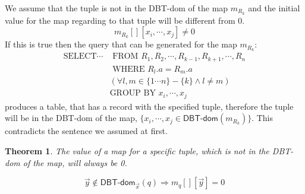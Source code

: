 \documentclass[12pt]{article}
\newtheorem{theorem}{Theorem}
\newcommand{\dom}{\textsf{DBT-dom}}
\begin{document}
We assume that the tuple is not in the \dom{} of the map $m_{R_k}$ and the initial value for the map regarding to that tuple will be different from 0.
$$m_{R_k}[][x_i,\cdots,x_j]\not= 0$$
If this is true then the query that can be generated for the map $m_{R_k}$:
\begin{align*}
\mbox{SELECT}\cdots&\mbox{ FROM }R_1,R_2,\cdots,R_{k-1},R_{k+1},\cdots,R_n\\
&\mbox{ WHERE }R_l.a=R_m.a\\
&(\forall l,m\in\{1\cdots n\}-\{k\}\land l\not=m)\\
&\mbox{GROUP BY } x_i,\cdots,x_j
\end{align*}
 produces a table, that has a record with the specified tuple, therefore the tuple will be in the \dom{} of the map, $\{x_i,\cdots,x_j\in \dom(m_{R_k}) \}$. This contradicts the sentence we assumed at first. 

\begin{theorem}
\label{thm:1}
The value of a map for a specific tuple, which is not in the \dom{} of the map, will always be 0.
\end{theorem}
$$\vec{y}\notin\dom{}_{\vec{x}}(q)\Rightarrow m_q[][\vec{y}]=0$$
\end{document}
